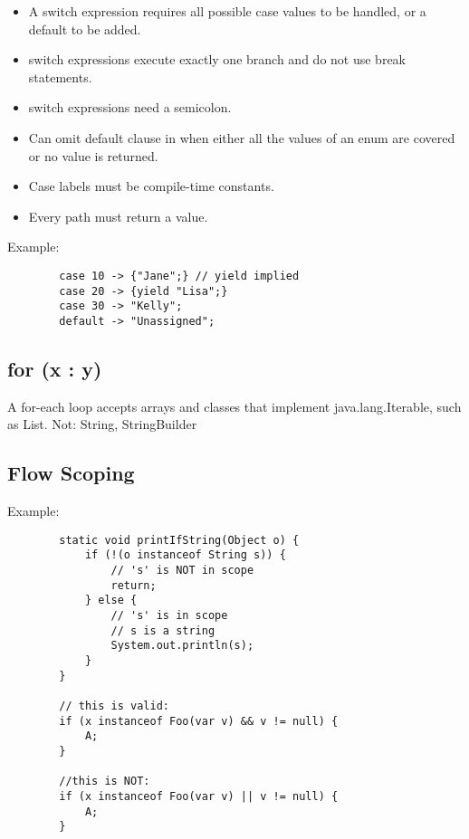 \documentclass{scrartcl}
\begin{document}
    \begin{itemize}
        \item A switch expression requires all possible case values to be handled, or a default to be added.
        \item switch expressions execute exactly one branch and do not use break statements.
        \item switch expressions need a semicolon.
        \item Can omit default clause in when either all the values of an enum are covered or no value is returned.
        \item Case labels must be compile-time constants.
        \item Every path must return a value.
    \end{itemize}

    Example:

    \begin{lstlisting}
        case 10 -> {"Jane";} // yield implied
        case 20 -> {yield "Lisa";}
        case 30 -> "Kelly";
        default -> "Unassigned";
    \end{lstlisting}

\subsection{ for (x : y)}

     A for-­each loop accepts arrays and classes that implement java.lang.Iterable, such as List. Not: String, StringBuilder

\subsection{Flow Scoping}

    Example:

    \begin{lstlisting}
        static void printIfString(Object o) {
            if (!(o instanceof String s)) {
                // 's' is NOT in scope
                return;
            } else {
                // 's' is in scope
                // s is a string
                System.out.println(s);
            }
        }

        // this is valid:
        if (x instanceof Foo(var v) && v != null) {
            A;
        }

        //this is NOT:
        if (x instanceof Foo(var v) || v != null) {
            A;
        }
    \end{lstlisting}
\end{document}
